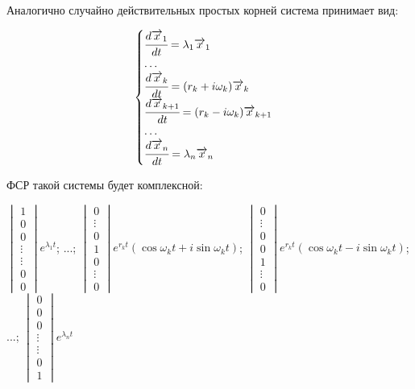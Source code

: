 Аналогично случайно действительных простых корней система принимает вид: 

\[ \begin{cases}
  \cfrac{d \overrightarrow{x}_1}{dt} = \lambda_1 \overrightarrow{x}_1 \\ 
  \ldots \\
  \cfrac{d \overrightarrow{x}_k}{dt} = (r_k + i \omega_k)\overrightarrow{x}_k \\
  \cfrac{d \overrightarrow{x}_{k+1}}{dt} = (r_k - i \omega_k)\overrightarrow{x}_{k+1} \\
  \ldots \\
  \cfrac{d \overrightarrow{x}_n}{dt} = \lambda_n \overrightarrow{x}_n
\end{cases}\]

ФСР такой системы будет комплексной:

$\begin{vmatrix*} 1 \\ 0 \\ 0 \\ \vdots \\ \vdots \\ 0 \\ 0 \end{vmatrix*} e^{\lambda_1 t}$; ...; 
$\begin{vmatrix*} 0 \\ \vdots \\ 0 \\ 1 \\ 0 \\ \vdots \\ 0 \end{vmatrix*} e^{r_k t} (\cos \omega_k t + i \sin \omega_k t)$;
$\begin{vmatrix*} 0 \\ \vdots \\ 0 \\ 0 \\ 1 \\ \vdots \\ 0 \end{vmatrix*} e^{r_k t} (\cos \omega_k t - i \sin \omega_k t)$; ...; 
$\begin{vmatrix*} 0 \\ 0 \\ 0 \\ \vdots \\ \vdots \\ 0 \\ 1 \end{vmatrix*} e^{\lambda_n t}$

